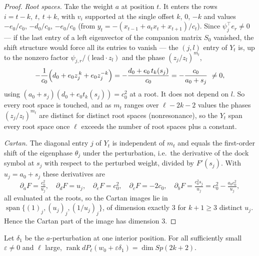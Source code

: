 \begin{proof}
\emph{Root spaces.} Take the weight $a$ at position $t$. It enters the rows
$i=t-k,\ t,\ t+k$, with $v_i$ supported at the single offset $k$, $0$, $-k$
and values $-e_0/c_0$, $-d_0/c_0$, $-e_0/c_0$ (from $y_t=-(x_{t-1}+a_tx_t+x_{t+1})/c_t$).
Since $\psi_j^{\!\top}e_r\ne0$ --- if the last entry of a left eigenvector of
the companion matrix $S_0$ vanished, the shift structure would force all its
entries to vanish --- the $(j,l)$ entry of $Y_t$ is, up to the nonzero factor
$\psi_{j,r}/(\text{lead}\cdot z_l)$ and the phase $(z_j/z_l)^{m_t}$,
\[
  -\frac{1}{c_0}\Bigl(d_0+e_0z_j^{\,k}+e_0z_j^{-k}\Bigr)
  = -\frac{d_0+e_0\,t_k(s_j)}{c_0}
  = -\frac{c_0}{a_0+s_j}\ \ne0,
\]
using $(a_0+s_j)(d_0+e_0t_k(s_j))=c_0^2$ at a root. It does not depend on $l$.
So every root space is touched, and as $m_t$ ranges over $\ell-2k-2$ values the
phases $(z_j/z_l)^{m_t}$ are distinct for distinct root spaces (nonresonance),
so the $Y_t$ span every root space once $\ell$ exceeds the number of root
spaces plus a constant.

\emph{Cartan.} The diagonal entry $j$ of $Y_t$ is independent of $m_t$ and
equals the first-order shift of the eigenphase $\theta_j$ under the perturbation,
i.e.\ the derivative of the dock symbol at $s_j$ with respect to the perturbed
weight, divided by $F'(s_j)$. With $u_j=a_0+s_j$ these derivatives are
\[
  \partial_a F=\tfrac{c_0^2}{u_j},\quad
  \partial_dF=u_j,\quad
  \partial_eF=c_0^2,\quad
  \partial_cF=-2c_0,\quad
  \partial_bF=\tfrac{c_0^2 s_j}{u_j}=c_0^2-\tfrac{a_0c_0^2}{u_j},
\]
all evaluated at the roots, so the Cartan images lie in
$\operatorname{span}\{(1)_j,(u_j)_j,(1/u_j)_j\}$, of dimension exactly $3$ for
$k+1\ge3$ distinct $u_j$. Hence the Cartan part of the image has dimension $3$.
\end{proof}

\begin{lemma}\label{lem:secondorder}
Let $\delta_1$ be the $a$-perturbation at one interior position. For all
sufficiently small $\varepsilon\ne0$ and $\ell$ large,
$\operatorname{rank}dP_\ell(w_0+\varepsilon\delta_1)=\dim Sp(2k+2)$.
\end{lemma}

